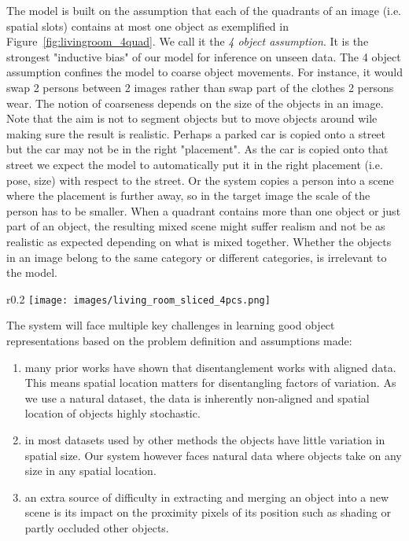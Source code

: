 \documentclass[12pt,a4paper]{article}
\begin{document}
The model is built on the assumption that each of the quadrants of an image (i.e. spatial slots) contains at most one object as exemplified in Figure~\ref{fig:livingroom_4quad}. We call it the \textit{4 object assumption}. It is the strongest "inductive bias" of our model for inference on unseen data. The 4 object assumption confines the model to coarse object movements. For instance, it would swap 2 persons between 2 images rather than swap part of the clothes 2 persons wear. The notion of coarseness depends on the size of the objects in an image. Note that the aim is not to segment objects but to move objects around wile making sure the result is realistic. Perhaps a parked car is copied onto a street but the car may not be in the right "placement". As the car is copied onto that street we expect the model to automatically put it in the right placement (i.e. pose, size) with respect to the street. Or the system copies a person into a scene where the placement is further away, so in the target image the scale of the person has to be smaller. When a quadrant contains more than one object or just part of an object, the resulting mixed scene might suffer realism and not be as realistic as expected depending on what is mixed together. Whether the objects in an image belong to the same category or different categories, is irrelevant to the model.
\begin{wrapfigure}{r}{0.2\textwidth}
\texttt{[image: images/living\_room\_sliced\_4pcs.png]} 
\caption{The 4 object assumption: 0 or 1 object per quadrant.} %
\label{fig:livingroom_4quad}
\end{wrapfigure}

The system will face multiple key challenges in learning good object representations based on the problem definition and assumptions made:
\begin{enumerate}
  \item many prior works have shown that disentanglement works with aligned data. This means spatial location matters for disentangling factors of variation. As we use a natural dataset, the data is inherently non-aligned and spatial location of objects highly stochastic.
  \item  in most datasets used by other methods the objects have little variation in spatial size. Our system however faces natural data where objects take on any size in any spatial location.
  \item an extra source of difficulty in extracting and merging an object into a new scene is its impact on the proximity pixels of its position such as shading or partly occluded other objects.
\end{enumerate}
\end{document}
